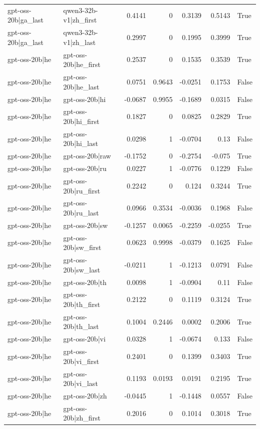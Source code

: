 \begin{table}
\begin{tabular}{l l r r r r l}
gpt-oss-20b|ga_last & qwen3-32b-v1|zh_first & 0.4141 & 0 & 0.3139 & 0.5143 & True \\
gpt-oss-20b|ga_last & qwen3-32b-v1|zh_last & 0.2997 & 0 & 0.1995 & 0.3999 & True \\
gpt-oss-20b|he & gpt-oss-20b|he_first & 0.2537 & 0 & 0.1535 & 0.3539 & True \\
gpt-oss-20b|he & gpt-oss-20b|he_last & 0.0751 & 0.9643 & -0.0251 & 0.1753 & False \\
gpt-oss-20b|he & gpt-oss-20b|hi & -0.0687 & 0.9955 & -0.1689 & 0.0315 & False \\
gpt-oss-20b|he & gpt-oss-20b|hi_first & 0.1827 & 0 & 0.0825 & 0.2829 & True \\
gpt-oss-20b|he & gpt-oss-20b|hi_last & 0.0298 & 1 & -0.0704 & 0.13 & False \\
gpt-oss-20b|he & gpt-oss-20b|raw & -0.1752 & 0 & -0.2754 & -0.075 & True \\
gpt-oss-20b|he & gpt-oss-20b|ru & 0.0227 & 1 & -0.0776 & 0.1229 & False \\
gpt-oss-20b|he & gpt-oss-20b|ru_first & 0.2242 & 0 & 0.124 & 0.3244 & True \\
gpt-oss-20b|he & gpt-oss-20b|ru_last & 0.0966 & 0.3534 & -0.0036 & 0.1968 & False \\
gpt-oss-20b|he & gpt-oss-20b|sw & -0.1257 & 0.0065 & -0.2259 & -0.0255 & True \\
gpt-oss-20b|he & gpt-oss-20b|sw_first & 0.0623 & 0.9998 & -0.0379 & 0.1625 & False \\
gpt-oss-20b|he & gpt-oss-20b|sw_last & -0.0211 & 1 & -0.1213 & 0.0791 & False \\
gpt-oss-20b|he & gpt-oss-20b|th & 0.0098 & 1 & -0.0904 & 0.11 & False \\
gpt-oss-20b|he & gpt-oss-20b|th_first & 0.2122 & 0 & 0.1119 & 0.3124 & True \\
gpt-oss-20b|he & gpt-oss-20b|th_last & 0.1004 & 0.2446 & 0.0002 & 0.2006 & True \\
gpt-oss-20b|he & gpt-oss-20b|vi & 0.0328 & 1 & -0.0674 & 0.133 & False \\
gpt-oss-20b|he & gpt-oss-20b|vi_first & 0.2401 & 0 & 0.1399 & 0.3403 & True \\
gpt-oss-20b|he & gpt-oss-20b|vi_last & 0.1193 & 0.0193 & 0.0191 & 0.2195 & True \\
gpt-oss-20b|he & gpt-oss-20b|zh & -0.0445 & 1 & -0.1448 & 0.0557 & False \\
gpt-oss-20b|he & gpt-oss-20b|zh_first & 0.2016 & 0 & 0.1014 & 0.3018 & True \\

\end{tabular}
\end{table}
